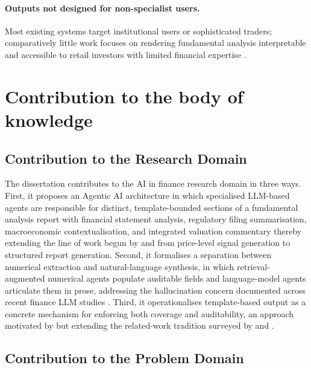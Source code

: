 \paragraph{\textbf{Outputs not designed for non-specialist users.}} Most existing systems target institutional users or sophisticated traders; comparatively little work focuses on rendering fundamental analysis interpretable and accessible to retail investors with limited financial expertise \citep{Bangun2025}.



\section{Contribution to the body of knowledge}
\subsection{Contribution to the Research Domain}
\label{sec:contrib-domain}


The dissertation contributes to the AI in finance research domain in three ways. First, it proposes an Agentic AI architecture in which specialised LLM-based agents are responsible for distinct, template-bounded sections of a fundamental analysis report with financial statement analysis, regulatory filing summarisation, macroeconomic contextualisation, and integrated valuation commentary thereby extending the line of work begun by \citet{Fatouros2025MarketSense} and \citet{Cheng2025} from price-level signal generation to structured report generation. Second, it formalises a separation between numerical extraction and natural-language synthesis, in which retrieval-augmented numerical agents populate auditable fields and language-model agents articulate them in prose, addressing the hallucination concern documented across recent finance LLM studies \citep{Xu2024IE,Cernevicene2024}. Third, it operationalises template-based output as a concrete mechanism for enforcing both coverage and auditability, an approach motivated by but extending the related-work tradition surveyed by \citet{Acharya2025AgenticAI} and \citet{rezaei2025gwise}.

\subsection{Contribution to the Problem Domain}
\label{sec:contrib-problem}

